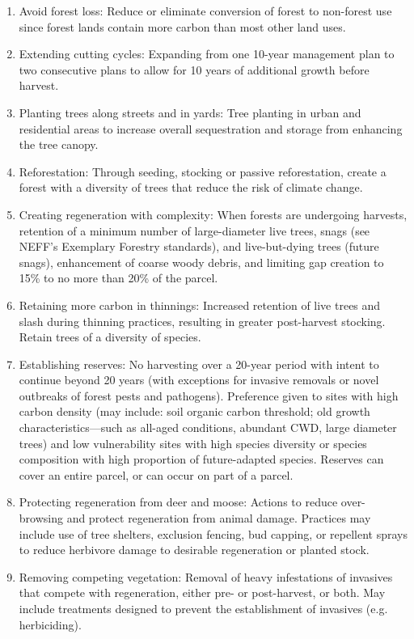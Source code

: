 \documentclass{article}\usepackage[]{graphicx}\usepackage[]{color}
\begin{document}
\begin{itemize}
    \begin{enumerate}
    \item Avoid forest loss: Reduce or eliminate conversion of forest to non-forest use since forest lands contain more carbon than most other land uses.
    \item Extending cutting cycles: Expanding from one 10-year management plan to two consecutive plans to allow for 10 years of additional growth before harvest.
    \item Planting trees along streets and in yards: Tree planting in urban and residential areas to increase overall sequestration and storage from enhancing the tree canopy. 
    \item Reforestation: Through seeding, stocking or passive reforestation, create a forest with a diversity of trees that reduce the risk of climate change.
    \item Creating regeneration with complexity: When forests are undergoing harvests, retention of a minimum number of large-diameter live trees, snags (see NEFF's Exemplary Forestry standards), and live-but-dying trees (future snags), enhancement of coarse woody debris, and limiting gap creation to 15\% to no more than 20\% of the parcel.
    \item Retaining more carbon in thinnings: Increased retention of live trees and slash during thinning practices, resulting in greater post-harvest stocking. Retain trees of a diversity of species.
    \item Establishing reserves: No harvesting over a 20-year period with intent to continue beyond 20 years (with exceptions for invasive removals or novel outbreaks of forest pests and pathogens). Preference given to sites with high carbon density (may include: soil organic carbon threshold; old growth characteristics---such as all-aged conditions, abundant CWD, large diameter trees) and low vulnerability sites with high species diversity or species composition with high proportion of future-adapted species. Reserves can cover an entire parcel, or can occur on part of a parcel. 
    \item Protecting regeneration from deer and moose: Actions to reduce over-browsing and protect regeneration from animal damage. Practices may include use of tree shelters, exclusion fencing, bud capping, or repellent sprays to reduce herbivore damage to desirable regeneration or planted stock. 
    \item Removing competing vegetation: Removal of heavy infestations of invasives that compete with regeneration, either pre- or post-harvest, or both. May include treatments designed to prevent the establishment of invasives (e.g. herbiciding).
    \end{enumerate}


\end{itemize}
\end{document}
